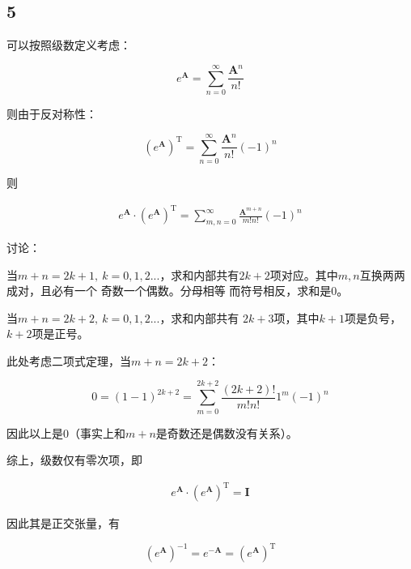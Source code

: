 \documentclass[UTF8,zihao=5]{ctexart}
\newcommand{\tran}[1]{#1^\mathrm{T}}
\begin{document}
\subsection*{5}

可以按照级数定义考虑：

$$
e^{\bm{A}}=\sum_{n=0}^\infty{
    \frac{\bm{A}^n}{n!}
}
$$

则由于反对称性：

$$
\tran{(e^{\bm{A}})}=\sum_{n=0}^\infty{
    \frac{\bm{A}^n}{n!}(-1)^n
}
$$

则

\begin{equation*}
\begin{split}
    e^{\bm{A}}\cdot\tran{(e^{\bm{A}})}
    =\sum_{m,n=0}^\infty{
        \frac{\bm{A}^{m+n}}{m!n!}(-1)^n
    }
\end{split}
\end{equation*}

讨论：

当$m+n=2k+1,\ k=0,1,2...$，求和内部共有$2k+2$项对应。其中$m,n$互换两两成对，且必有一个
奇数一个偶数。分母相等
而符号相反，求和是0。

当$m+n=2k+2,\ k=0,1,2...$，求和内部共有
$2k+3$项，其中$k+1$项是负号，$k+2$项是正号。

此处考虑二项式定理，当$m+n=2k+2$：

$$
0=(1-1)^{2k+2}=\sum_{m=0}^{2k+2}
\frac{(2k+2)!}{m!n!}1^m(-1)^n
$$

因此以上是0（事实上和$m+n$是奇数还是偶数没有关系）。

综上，级数仅有零次项，即

\begin{equation*}
    \begin{split}
        e^{\bm{A}}\cdot\tran{(e^{\bm{A}})}
        =\bm{I}
\end{split}
\end{equation*}

因此其是正交张量，有

$$
(e^{\bm{A}})^{-1}=e^{\bm{-A}}=\tran{(e^{\bm{A}})}
$$
\end{document}
